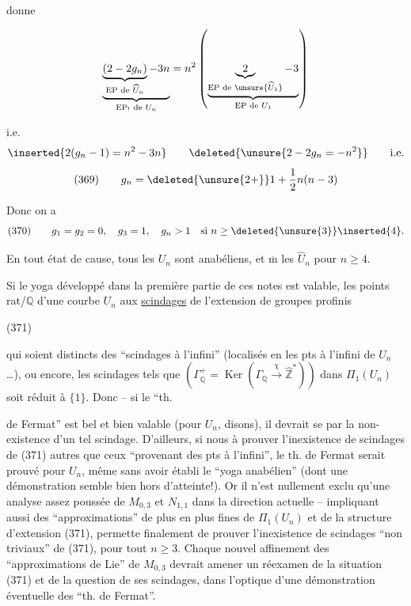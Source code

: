 
donne

\[
\underbrace{\underbrace{(2-2g_n)}_{\text{EP de }\widehat U_n}-3n}_{\text{EP}_{!}\text{ de }U_n}
=n^2\left(\underbrace{\underbrace{2}_{\text{EP de }\unsure{\widehat U_1}}-3}_{\text{EP de }U_1}\right)
\]

i.e.
\[
\inserted{2(g_n-1)=n^2-3n}
\qquad
\deleted{\unsure{2-2g_n=-n^2}}
\qquad \text{i.e.}
\]
\[
\text{(369)}\qquad g_n=\deleted{\unsure{2+}}1+\frac12 n(n-3)
\]

Donc on a
\[
\text{(370)}\qquad g_1=g_2=0,\quad g_3=1,\quad g_n>1\quad\text{si }n\geq\deleted{\unsure{3}}\inserted{4}.
\]

En tout état de cause, tous les $U_n$ sont anabéliens, et $\overline{\mathrm m}$ les $\widehat U_n$ pour $n\geq4$.

Si le yoga  développé dans la première partie de ces notes est valable, les   points rat/$\mathbb Q$ d'une courbe $U_n$   aux \uline{scindages} de l'extension de groupes profinis

\begin{samepage}
\noindent (371)
\end{samepage}

qui soient distincts des ``scindages à l'infini'' (localisés en les  pts à l'infini de $U_n$\ldots), ou encore, les scindages tels que  $(\Gamma_{\mathbb Q}^{+}=\operatorname{Ker}(\Gamma_{\mathbb Q}\xrightarrow{\chi}\widehat{\mathbb Z}^{*}))$ dans $\Pi_1(U_n)$ soit réduit à $\{1\}$. Donc -- si le ``th.


de Fermat'' est bel et bien valable (pour $U_n$, disons), il devrait se  par la non-existence d'un tel scindage. D'ailleurs, si nous  à prouver l'inexistence de scindages de (371) autres que ceux ``provenant des pts à l'infini'', le th. de Fermat serait prouvé pour $U_n$, même sans avoir établi le ``yoga anabélien'' (dont une démonstration semble bien hors d'atteinte!). Or il n'est nullement exclu qu'une analyse assez poussée de $M_{0,3}$ et $N_{1,1}$ dans la direction actuelle -- impliquant aussi des ``approximations'' de plus en plus fines de $\Pi_1(U_n)$ et de la structure d'extension (371), permette finalement de prouver l'inexistence de scindages ``non triviaux'' de (371), pour tout $n\geq3$. Chaque nouvel affinement des ``approximations de Lie'' de $M_{0,3}$ devrait amener un réexamen de la situation (371) et de la question de ses scindages, dans l'optique d'une démonstration éventuelle des ``th. de Fermat''.

